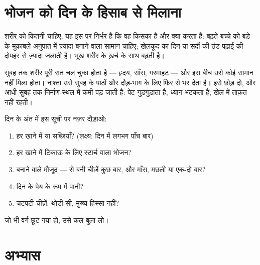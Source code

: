 \section{भोजन को दिन के हिसाब से मिलाना}

\begin{proposition}[ज़रूरतें दिन और व्यक्ति के साथ बदलती हैं]\label{prop:g3:balanced-diet:needs}
शरीर को कितनी  चाहिए, यह इस पर निर्भर है कि वह किसका है और क्या
करता है: बढ़ते बच्चे को बड़े के मुक़ाबले अनुपात में ज़्यादा बनाने वाला
सामान चाहिए; खेलकूद का दिन या सर्दी की ठंड पढ़ाई की दोपहर से ज़्यादा
 जलाती है। भूख शरीर के ख़र्च के साथ बढ़ती है।
\end{proposition}
\admitted

\begin{example}[नाश्ता क्यों मायने रखता है]\label{ex:g3:balanced-diet:breakfast}
सुबह तक शरीर पूरी रात चल चुका होता है --- हृदय, साँस, गरमाहट --- और
इस बीच उसे कोई सामान नहीं मिला होता। नाश्ता उसे सुबह के पाठों और
दौड़-भाग के लिए फिर से भर देता है। इसे छोड़ दो, और आधी सुबह तक
निर्माण-स्थल में कमी पड़ जाती है: पेट गुड़गुड़ाता है, ध्यान भटकता है,
खेल में ताक़त नहीं रहती।
\end{example}

\begin{method}[दिन का संतुलन जाँचना]\label{met:g3:balanced-diet:check}
दिन के अंत में इस सूची पर नज़र दौड़ाओ:
\begin{enumerate}
  \item हर खाने में  या सब्ज़ियाँ? (लक्ष्य: दिन में लगभग पाँच बार)
  \item हर खाने में टिकाऊ  के लिए स्टार्च वाला भोजन?
  \item बनाने वाले मौजूद ---  से बनी चीज़ें कुछ बार, और माँस, मछली
        या  एक-दो बार?
  \item दिन के पेय के रूप में पानी?
  \item चटपटी चीज़ें: थोड़ी-सी, मुख्य हिस्सा नहीं?
\end{enumerate}
जो भी वर्ग छूट गया हो, उसे कल बुला लो।
\end{method}

\section{अभ्यास}

